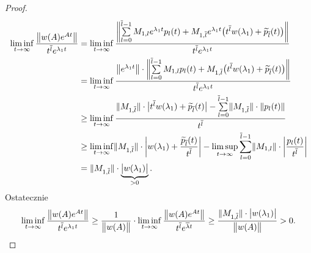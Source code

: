 \begin{proof}
%
  \begin{align*}
    \liminf_{t\to\infty} \frac{\norm[\big]{w(A) e^{At}}}{t^{\overline{l}} e^{\lambda_1 t}} &=
    \liminf_{t\to\infty} \frac{\norm[\bigg]{\sum\limits_{l=0}^{\overline{l}-1} M_{1,l} e^{\lambda_1 t} 
    p_l(t) + 
    M_{1,\overline{l}} e^{\lambda_1 t} \p[\big]{t^{\overline{l}} w(\lambda_1) + \widetilde{p}_{\overline{l}} (t)} }} 
    {t^{\overline{l}} e^{\lambda_1 t}} \\
    &= \liminf_{t\to\infty} \frac{\norm[\big]{e^{\lambda_1 t}} \cdot 
    \norm[\bigg]{\sum\limits_{l=0}^{\overline{l}-1} 
    M_{1,l} 
    p_l(t) + M_{1,\overline{l}} \p[\big]{t^{\overline{l}} w(\lambda_1) + \widetilde{p}_{\overline{l}} (t)} }} 
    {t^{\overline{l}} e^{\lambda_1 t}} \\
    &\geq \liminf_{t\to\infty} \frac{ \norm{M_{1,\overline{l}}} \cdot \abs[\big]{ t^{\overline{l}} w(\lambda_1) + 
    \widetilde{p}_{\overline{l}}(t) } - \sum\limits_{l=0}^{\overline{l}-1} \norm{M_{1,\overline{l}}} \cdot 
    \norm{p_l(t)} }{t^{\overline{l}}} \\
    &\geq \liminf_{t\to\infty} \norm{M_{1,\overline{l}}} \cdot \abs*{w(\lambda_1) + 
    \frac{\widetilde{p}_{\overline{l}}(t)}{t^{\overline{l}}}} - \limsup_{t\to\infty} \sum_{l=0}^{\overline{l}-1} 
    \norm{M_{1,l}} \cdot \abs*{\frac{p_l(t)}{t^{\overline{l}}}} \\ 
    &= \norm{M_{1,\overline{l}}} \cdot 
    \underbrace{\abs[\big]{w(\lambda_1)}}_{>0}.
  \end{align*}
%
  Ostatecznie
%
  \begin{equation*}
    \liminf_{t\to\infty} \frac{\norm[\big]{w(A) e^{At}}}{t^{\overline{l}} e^{\lambda_1 t}} \geq 
    \frac{1}{\norm[\big]{w(A)}} \cdot \liminf_{t\to\infty} \frac{\norm[\big]{w(A) e^{At}}}{t^{\overline{l}} 
    e^{\overline{\lambda} t}} \geq \frac{\norm{M_{1,\overline{l}}} \cdot \abs[\big]{w(\lambda_1)}}{\norm[\big]{w(A)}}
    >0. \qedhere
  \end{equation*}
\end{proof}
































